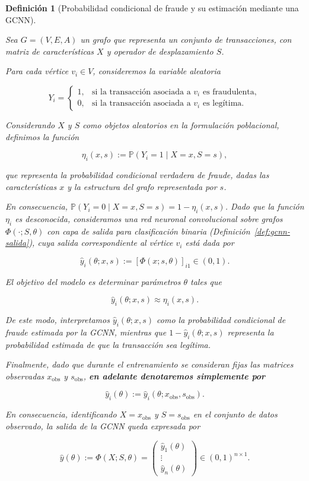 \documentclass[a4paper,openany,oneside,10pt]{report}
\theoremstyle{pnlTeorema}
\theoremstyle{pnlDefinicion}
\newtheorem{definicion}{Definición}[section]
\theoremstyle{pnlObservacion}
\begin{document}
\begin{definicion}[Probabilidad condicional de fraude y su estimación mediante una GCNN]
\label{def:probabilidad-fraude}

Sea $G=(V,E,A)$ un grafo que representa un conjunto de transacciones, con matriz de características $X$ y operador de desplazamiento $S$.

Para cada vértice $v_i\in V$, consideremos la variable aleatoria

\[
Y_i=
\begin{cases}
1, & \text{si la transacción asociada a }v_i\text{ es fraudulenta},\\
0, & \text{si la transacción asociada a }v_i\text{ es legítima}.
\end{cases}
\]

Considerando $X$ y $S$ como objetos aleatorios en la formulación poblacional, definimos la función

\[
\boxed{
\eta_i(x,s):=
\mathbb P(Y_i=1\mid X=x,S=s),
}
\]

que representa la probabilidad condicional verdadera de fraude, dadas las características $x$ y la estructura del grafo representada por $s$.

En consecuencia, $\mathbb P(Y_i=0\mid X=x,S=s)=1-\eta_i(x,s)$. Dado que la función $\eta_i$ es desconocida, consideramos una red neuronal convolucional sobre grafos $\Phi(\cdot;S,\theta)$ con capa de salida para clasificación binaria (Definición~\ref{def:gcnn-salida}), cuya salida correspondiente al vértice $v_i$ está dada por

\[
\hat y_i(\theta;x,s):=
[\Phi(x;s,\theta)]_{i1}\in(0,1).
\]

El objetivo del modelo es determinar parámetros $\theta$ tales que

\[
\boxed{
\hat y_i(\theta;x,s)\approx\eta_i(x,s).
}
\]

De este modo, interpretamos $\hat y_i(\theta;x,s)$ como la probabilidad condicional de fraude estimada por la GCNN, mientras que $1-\hat y_i(\theta;x,s)$ representa la probabilidad estimada de que la transacción sea legítima.

Finalmente, dado que durante el entrenamiento se consideran fijas las matrices observadas $x_{\mathrm{obs}}$ y $s_{\mathrm{obs}}$, \textbf{en adelante denotaremos simplemente por}

\[
\boxed{
\hat y_i(\theta):=
\hat y_i(\theta;x_{\mathrm{obs}},s_{\mathrm{obs}}).
}
\]

En consecuencia, identificando $X=x_{\mathrm{obs}}$ y $S=s_{\mathrm{obs}}$ en el conjunto de datos observado, la salida de la GCNN queda expresada por

\[
\hat y(\theta):=\Phi(X;S,\theta)
=
\begin{pmatrix}
\hat y_1(\theta)\\
\vdots\\
\hat y_n(\theta)
\end{pmatrix}
\in(0,1)^{n\times 1}.
\]

\end{definicion}
\end{document}
